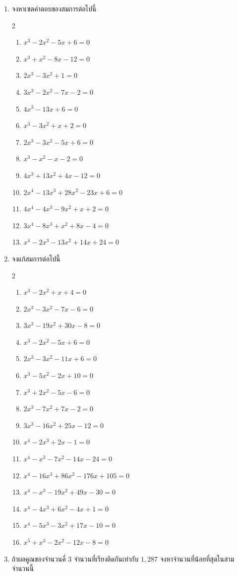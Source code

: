 \begin{enumerate}[label=\arabic*., leftmargin=*, itemsep=0.5em]
	\item จงหาเซตคำตอบของสมการต่อไปนี้
\begin{multicols}{2}
	\begin{enumerate}[label=\theenumi\arabic*), leftmargin=2em, itemsep=0.6em]
		\item $x^3 - 2x^2 - 5x + 6 = 0$
		\item $x^3 + x^2 - 8x - 12 = 0$
		\item $2x^3 - 3x^2 + 1 = 0$
		\item $3x^3 - 2x^2 - 7x - 2 = 0$
		\item $4x^3 - 13x + 6 = 0$
		\item $x^3 - 3x^2 + x + 2 = 0$
		\item $2x^3 - 3x^2 - 5x + 6 = 0$
		\item $x^3 - x^2 - x - 2 = 0$
		\item $4x^3 + 13x^2 + 4x - 12 = 0$
		\item $2x^4 - 13x^3 + 28x^2 - 23x + 6 = 0$
		\item $4x^4 - 4x^3 - 9x^2 + x + 2 = 0$
		\item $3x^4 - 8x^3 + x^2 + 8x - 4 = 0$
		\item $x^4 - 2x^3 - 13x^2 + 14x + 24 = 0$
	\end{enumerate}
\end{multicols}	
\item จงแก้สมการต่อไปนี้
\begin{multicols}{2}
	\begin{enumerate}[label=\theenumi\arabic*), leftmargin=2em, itemsep=0.5em]
	\item $x^3 - 2x^2 + x + 4 = 0$
	\item $2x^3 - 3x^2 - 7x - 6 = 0$
	\item $3x^3 - 19x^2 + 30x - 8 = 0$
	\item $x^3 - 2x^2 - 5x + 6 = 0$
	\item $2x^3 - 3x^2 - 11x + 6 = 0$
	\item $x^3 - 5x^2 - 2x + 10 = 0$
	\item $x^3 + 2x^2 - 5x - 6 = 0$
	\item $2x^3 - 7x^2 + 7x - 2 = 0$
	\item $3x^3 - 16x^2 + 25x - 12 = 0$
	\item $x^4 - 2x^3 + 2x - 1 = 0$
	\item $x^4 - x^3 - 7x^2 - 14x - 24 = 0$
	\item $x^4 - 16x^3 + 86x^2 - 176x + 105 = 0$
	\item $x^4 - x^3 - 19x^2 + 49x - 30 = 0$
	\item $x^4 - 4x^3 + 6x^2 - 4x + 1 = 0$
	\item $x^4 - 5x^3 - 3x^2 + 17x - 10 = 0$
	\item $x^5 + x^3 - 2x^2 - 12x - 8 = 0$
	\end{enumerate}
\end{multicols}	
	\item ถ้าผลคูณของจำนวนคี่ $3$ จำนวนที่เรียงติดกันเท่ากับ $1,287$ จงหาจำนวนที่น้อยที่สุดในสามจำนวนนี้
	

\end{enumerate}
